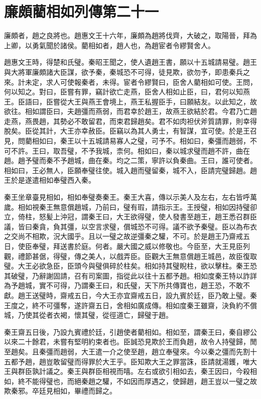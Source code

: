 \chapter{廉頗藺相如列傳第二十一}

廉頗者，趙之良將也。趙惠文王十六年，廉頗為趙將伐齊，大破之，取陽晉，拜為上卿，以勇氣聞於諸侯。藺相如者，趙人也，為趙宦者令繆賢舍人。

趙惠文王時，得楚和氏璧。秦昭王聞之，使人遺趙王書，願以十五城請易璧。趙王與大將軍廉頗諸大臣謀，欲予秦，秦城恐不可得，徒見欺，欲勿予，即患秦兵之來。計未定，求人可使報秦者，未得。宦者令繆賢曰，臣舍人藺相如可使。王問，何以知之。對曰，臣嘗有罪，竊計欲亡走燕，臣舍人相如止臣，曰，君何以知燕王。臣語曰，臣嘗從大王與燕王會境上，燕王私握臣手，曰願結友。以此知之，故欲往。相如謂臣曰，夫趙彊而燕弱，而君幸於趙王，故燕王欲結於君。今君乃亡趙走燕，燕畏趙，其勢必不敢留君，而束君歸趙矣。君不如肉袒伏斧質請罪，則幸得脫矣。臣從其計，大王亦幸赦臣。臣竊以為其人勇士，有智謀，宜可使。於是王召見，問藺相如曰，秦王以十五城請易寡人之璧，可予不。相如曰，秦彊而趙弱，不可不許。王曰，取吾璧，不予我城，柰何。相如曰，秦以城求璧而趙不許，曲在趙。趙予璧而秦不予趙城，曲在秦。均之二策，寧許以負秦曲。王曰，誰可使者。相如曰，王必無人，臣願奉璧往使。城入趙而璧留秦，城不入，臣請完璧歸趙。趙王於是遂遣相如奉璧西入秦。

秦王坐章臺見相如，相如奉璧奏秦王。秦王大喜，傳以示美人及左右，左右皆呼萬歲。相如視秦王無意償趙城，乃前曰，璧有瑕，請指示王。王授璧，相如因持璧卻立，倚柱，怒髪上沖冠，謂秦王曰，大王欲得璧，使人發書至趙王，趙王悉召群臣議，皆曰秦貪，負其彊，以空言求璧，償城恐不可得。議不欲予秦璧。臣以為布衣之交尚不相欺，況大國乎。且以一璧之故逆彊秦之驩，不可。於是趙王乃齋戒五日，使臣奉璧，拜送書於庭。何者。嚴大國之威以修敬也。今臣至，大王見臣列觀，禮節甚倨，得璧，傳之美人，以戲弄臣。臣觀大王無意償趙王城邑，故臣復取璧。大王必欲急臣，臣頭今與璧俱碎於柱矣。相如持其璧睨柱，欲以擊柱。秦王恐其破璧，乃辭謝固請，召有司案圖，指從此以往十五都予趙。相如度秦王特以詐詳為予趙城，實不可得，乃謂秦王曰，和氏璧，天下所共傳寶也，趙王恐，不敢不獻。趙王送璧時，齋戒五日，今大王亦宜齋戒五日，設九賓於廷，臣乃敢上璧。秦王度之，終不可彊奪，遂許齋五日，舍相如廣成傳。相如度秦王雖齋，決負約不償城，乃使其從者衣褐，懷其璧，從徑道亡，歸璧于趙。

秦王齋五日後，乃設九賓禮於廷，引趙使者藺相如。相如至，謂秦王曰，秦自繆公以來二十餘君，未嘗有堅明約束者也。臣誠恐見欺於王而負趙，故令人持璧歸，閒至趙矣。且秦彊而趙弱，大王遣一介之使至趙，趙立奉璧來。今以秦之彊而先割十五都予趙，趙豈敢留璧而得罪於大王乎。臣知欺大王之罪當誅，臣請就湯鑊，唯大王與群臣孰計議之。秦王與群臣相視而嘻。左右或欲引相如去，秦王因曰，今殺相如，終不能得璧也，而絕秦趙之驩，不如因而厚遇之，使歸趙，趙王豈以一璧之故欺秦邪。卒廷見相如，畢禮而歸之。

